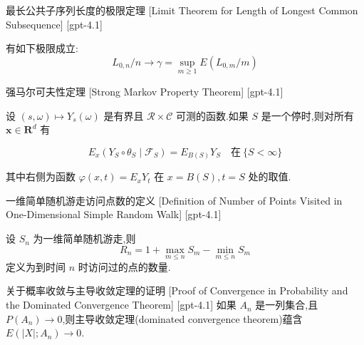 \documentclass[UTF8]{ctexart}
\begin{document}
    
    
    \begin{thm}
        {最长公共子序列长度的极限定理}
        [Limit Theorem for Length of Longest Common Subsequence]
        [gpt-4.1]
        
有如下极限成立:
\[
L_{0, n} / n \to \gamma = \sup_{m \geq 1} E ( L_{0, m} / m )
\]

    \end{thm}
    
    
    
    \begin{thm}
        {强马尔可夫性定理}
        [Strong Markov Property Theorem]
        [gpt-4.1]
        
设 $(s, \omega) \mapsto Y_s(\omega)$ 是有界且 $\mathcal{R} \times \mathcal{C}$ 可测的函数.如果 $S$ 是一个停时,则对所有 $\mathbf{x} \in \mathbf{R}^d$ 有

\[
E_x (Y_S \circ \theta_S \mid \mathcal{F}_S) = E_{B(S)} Y_S \quad \text{在} \ \{ S < \infty \}
\]

其中右侧为函数 $\varphi(x, t) = E_x Y_t$ 在 $x = B(S), t = S$ 处的取值.

    \end{thm}
    
    
    
    \begin{dfn}
        {一维简单随机游走访问点数的定义}
        [Definition of Number of Points Visited in One-Dimensional Simple Random Walk]
        [gpt-4.1]
        
设 $S_n$ 为一维简单随机游走,则
\[
R_n = 1 + \max_{m \leq n} S_m - \min_{m \leq n} S_m
\]
定义为到时间 $n$ 时访问过的点的数量.

    \end{dfn}
    
    
    
    \begin{prf}
        {关于概率收敛与主导收敛定理的证明}
        [Proof of Convergence in Probability and the Dominated Convergence Theorem]
        [gpt-4.1]
        如果 $A_n$ 是一列集合,且 $P(A_n) \to 0$,则主导收敛定理(dominated convergence theorem)蕴含 $E(|X|;A_n) \to 0$.
    \end{prf}
    
    
    
\end{document}
